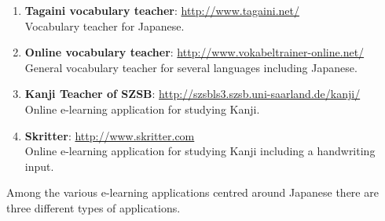 \begin{enumerate}
          \url{http://www.kanjigym.de/} \\
          E-Learning application for studying Kanji with the Heisig 
          system.\footnote{The Heisig system is a method for studying Kanji,
            discussed in section~\ref{sec:japanesedifficulties}.}
    \item \textbf{Tagaini vocabulary teacher}:
          \url{http://www.tagaini.net/} \\
          Vocabulary teacher for Japanese.
    \item \textbf{Online vocabulary teacher}:
          \url{http://www.vokabeltrainer-online.net/} \\
          General vocabulary teacher for several languages including Japanese.
    \item \textbf{Kanji Teacher of SZSB}:
          \url{http://szsbls3.szsb.uni-saarland.de/kanji/} \\
          Online e-learning application for studying Kanji.
    \item \textbf{Skritter}:
          \url{http://www.skritter.com} \\
          Online e-learning application for studying Kanji including a
          handwriting input.
\end{enumerate}
Among the various e-learning applications centred around Japanese there are 
three different types of applications.


